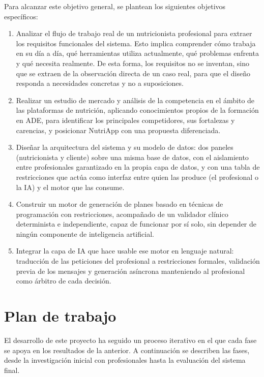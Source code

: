 Para alcanzar este objetivo general, se plantean los siguientes objetivos específicos:

\begin{enumerate}
    \item Analizar el flujo de trabajo real de un nutricionista profesional para extraer los requisitos funcionales del sistema. Esto implica comprender cómo trabaja en su día a día, qué herramientas utiliza actualmente, qué problemas enfrenta y qué necesita realmente. De esta forma, los requisitos no se inventan, sino que se extraen de la observación directa de un caso real, para que el diseño responda a necesidades concretas y no a suposiciones.

    \item Realizar un estudio de mercado y análisis de la competencia en el ámbito de las plataformas de nutrición, aplicando conocimientos propios de la formación en ADE, para identificar los principales competidores, sus fortalezas y carencias, y posicionar NutriApp con una propuesta diferenciada.

    \item Diseñar la arquitectura del sistema y su modelo de datos: dos paneles (nutricionista y cliente) sobre una misma base de datos, con el aislamiento entre profesionales garantizado en la propia capa de datos, y con una tabla de restricciones que actúa como interfaz entre quien las produce (el profesional o la IA) y el motor que las consume.

    \item Construir un motor de generación de planes basado en técnicas de programación con restricciones, acompañado de un validador clínico determinista e independiente, capaz de funcionar por sí solo, sin depender de ningún componente de inteligencia artificial.

    \item Integrar la capa de IA que hace usable ese motor en lenguaje natural: traducción de las peticiones del profesional a restricciones formales, validación previa de los mensajes y generación asíncrona manteniendo al profesional como árbitro de cada decisión.
\end{enumerate}


\section{Plan de trabajo}
El desarrollo de este proyecto ha seguido un proceso iterativo en el que cada fase se apoya en los resultados de la anterior. A continuación se describen las fases, desde la investigación inicial con profesionales hasta la evaluación del sistema final.

